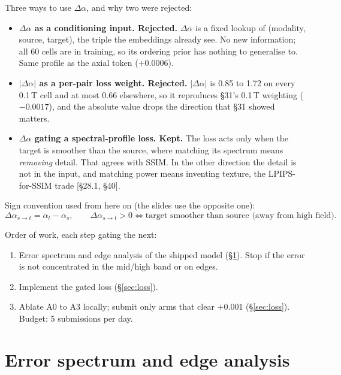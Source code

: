 \documentclass[10pt,a4paper]{article}
\newcommand{\da}{\Delta\alpha}
\begin{document}
Three ways to use $\da$, and why two were rejected:
\begin{itemize}
  \item \textbf{$\da$ as a conditioning input. Rejected.} $\da$ is a fixed lookup of
        (modality, source, target), the triple the embeddings already see. No new information;
        all 60 cells are in training, so its ordering prior has nothing to generalise to.
        Same profile as the axial token ($+0.0006$).
  \item \textbf{$|\da|$ as a per-pair loss weight. Rejected.} $|\da|$ is 0.85 to 1.72 on every
        0.1\,T cell and at most 0.66 elsewhere, so it reproduces \S31's 0.1\,T weighting
        ($-0.0017$), and the absolute value drops the direction that \S31 showed matters.
  \item \textbf{$\da$ gating a spectral-profile loss. Kept.} The loss acts only when the target
        is smoother than the source, where matching its spectrum means \emph{removing} detail.
        That agrees with SSIM. In the other direction the detail is not in the input, and
        matching power means inventing texture, the LPIPS-for-SSIM trade [\S28.1, \S40].
\end{itemize}

Sign convention used from here on (the slides use the opposite one):
\[
  \da_{s\to t} = \alpha_t - \alpha_s, \qquad
  \da_{s\to t} > 0 \iff \text{target smoother than source (away from high field)}.
\]

Order of work, each step gating the next:
\begin{enumerate}[itemsep=0.6mm,topsep=1mm]
  \item Error spectrum and edge analysis of the shipped model (\S\ref{sec:analysis}). Stop if the
        error is not concentrated in the mid/high band or on edges.
  \item Implement the gated loss (\S\ref{sec:loss}).
  \item Ablate A0 to A3 locally; submit only arms that clear $+0.001$ (\S\ref{sec:loss}).
        Budget: 5 submissions per day.
\end{enumerate}

\section{Error spectrum and edge analysis}\label{sec:analysis}
\end{document}
